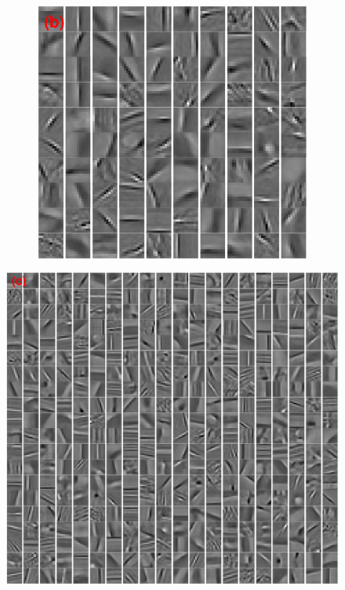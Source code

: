 \begin{figure}[h]
\begin{minipage}{0.4\textwidth}
\begin{subfigure}{1\textwidth}
    \centering
  \includegraphics[width=0.6\linewidth]{figure/online100-filter.pdf}
\end{subfigure}
\end{minipage}
\begin{minipage}{0.5\textwidth}
\centering
\includegraphics[width=1\linewidth]{figure/online400-filter.pdf}
\end{minipage}
    \\
    \\
    \\
\end{figure}
